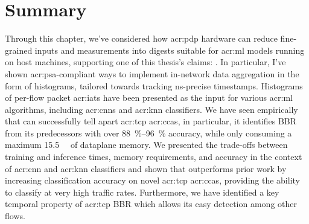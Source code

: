 \section{Summary}\label{sec:seidr-conclusion}
%

Through this chapter, we've considered how \gls{acr:pdp} hardware can reduce fine-grained inputs and measurements into digests suitable for \gls{acr:ml} models running on host machines, supporting one of this thesis's claims: .
In particular, I've shown \gls{acr:psa}-compliant ways to implement in-network data aggregation in the form of histograms, tailored towards tracking \unit{\nano\second}-precise timestamps.
Histograms of per-flow packet \glspl{acr:iat} have been presented as the input for various \gls{acr:ml} algorithms, including \glspl{acr:cnn} and \gls{acr:knn} classifiers.
We have seen empirically that \seidr{} can successfully tell apart \gls{acr:tcp} \glspl{acr:cca}, in particular, it identifies BBR from its predecessors with over \qtyrange{88}{96}{\percent} accuracy, while only consuming a maximum \qty{15.5}{\mebi\byte} of dataplane memory.
We presented the trade-offs between training and inference times, memory requirements, and accuracy in the context of \gls{acr:cnn} and \gls{acr:knn} classifiers and shown that \seidr{} outperforms prior work by increasing classification accuracy on novel \gls{acr:tcp} \glspl{acr:cca}, providing the ability to classify at very high traffic rates.
Furthermore, we have identified a key temporal property of \gls{acr:tcp} BBR which allows its easy detection among other flows.
